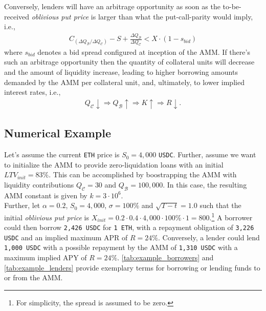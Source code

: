 \documentclass[a4paper]{article}
\begin{document}
Conversely, lenders will have an arbitrage opportunity as soon as the to-be-received \emph{oblivious put price} is larger than what the put-call-parity would imply, i.e.,
\begin{equation}
\label{eq:option_premium_lenders}
\begin{split}
C_{(\Delta Q_\mathcal{B} / \Delta Q_\mathcal{C})} - S + \frac{\Delta Q_\mathcal{B}}{\Delta Q_\mathcal{C}} < X \cdot (1-s_{bid})
\end{split}
\end{equation}
where $s_{bid}$ denotes a bid spread configured at inception of the AMM. If there's such an arbitrage opportunity then the quantity of collateral units will decrease and the amount of liquidity increase, leading to higher borrowing amounts demanded by the AMM per collateral unit, and, ultimately, to lower implied interest rates, i.e.,
\begin{equation}
\begin{split}
Q_\mathcal{C}\downarrow \Rightarrow Q_\mathcal{B}\uparrow \Rightarrow K\uparrow \Rightarrow R\downarrow.
\end{split}
\end{equation}


\subsection{Numerical Example}
Let's assume the current \verb|ETH| price is $S_0=4,000$ \verb|USDC|. Further, assume we want to initialize the AMM to provide zero-liquidation loans with an initial $LTV_{init}=83\%$. This can be accomplished by boostrapping the AMM with liquidity contributions $Q_\mathcal{C}=30$ and $Q_\mathcal{B}=100,000$. In this case, the resulting AMM constant is given by $k=3\cdot10^6$.\\

Further, let $\alpha=0.2$, $S_0=4,000$, $\sigma=100\%$ and $\sqrt{T-t}=1.0$ such that the initial \emph{oblivious put price} is $X_{init} = 0.2 \cdot 0.4 \cdot 4,000 \cdot 100\% \cdot 1 = 800$.\footnote{For simplicity, the spread is assumed to be zero.} A borrower could then borrow \verb|2,426 USDC| for \verb|1 ETH|, with a repayment obligation of \verb|3,226 USDC| and an implied maximum APR of $R=24\%$. Conversely, a lender could lend \verb|1,000 USDC| with a possible repayment by the AMM of \verb|1,310 USDC| with a maximum implied APY of $R=24\%$. \cref{tab:example_borrowers} and \cref{tab:example_lenders} provide exemplary terms for borrowing or lending funds to or from the AMM.
\end{document}
